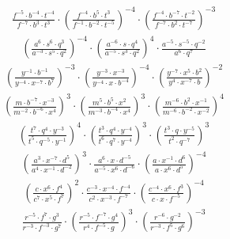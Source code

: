 \begin{align}
\frac{f^{-5}\cdot b^{-4}\cdot t^{-4}}{f^{-7}\cdot b^{3}\cdot t^{3}}\cdot \left(\frac{f^{-4}\cdot b^{5}\cdot t^{3}}{f^{-1}\cdot b^{-2}\cdot t^{-5}}\right)^{-4}\cdot \left(\frac{f^{-4}\cdot b^{-7}\cdot t^{-2}}{f^{-7}\cdot b^{2}\cdot t^{-7}}\right)^{-3}
\end{align}
\begin{align}
\left(\frac{a^{6}\cdot s^{6}\cdot q^{3}}{a^{-3}\cdot s^{5}\cdot q^{2}}\right)^{-4}\cdot \left(\frac{a^{-6}\cdot s\cdot q^{4}}{a^{-5}\cdot s^{3}\cdot q^{2}}\right)^{4}\cdot \frac{a^{-5}\cdot s^{-5}\cdot q^{-2}}{a^{6}\cdot q^{7}}
\end{align}
\begin{align}
\left(\frac{y^{-1}\cdot b^{-1}}{y^{-4}\cdot x^{-7}\cdot b^{7}}\right)^{-3}\cdot \left(\frac{y^{-3}\cdot x^{-3}}{y^{-4}\cdot x\cdot b^{-4}}\right)^{-4}\cdot \left(\frac{y^{-7}\cdot x^{5}\cdot b^{2}}{y^{4}\cdot x^{-7}\cdot b}\right)^{-2}
\end{align}
\begin{align}
\left(\frac{m\cdot b^{-7}\cdot x^{-3}}{m^{-2}\cdot b^{-6}\cdot x^{4}}\right)^{3}\cdot \left(\frac{m^{5}\cdot b^{5}\cdot x^{2}}{m^{-3}\cdot b^{-4}\cdot x^{4}}\right)^{3}\cdot \left(\frac{m^{-6}\cdot b^{2}\cdot x^{-1}}{m^{-6}\cdot b^{-2}\cdot x^{-2}}\right)^{4}
\end{align}
\begin{align}
\left(\frac{t^{7}\cdot q^{4}\cdot y^{-3}}{t^{5}\cdot q^{-5}\cdot y^{-1}}\right)^{4}\cdot \left(\frac{t^{3}\cdot q^{4}\cdot y^{-4}}{t^{6}\cdot q^{7}\cdot y^{-4}}\right)^{3}\cdot \left(\frac{t^{3}\cdot q\cdot y^{-5}}{t^{2}\cdot q^{-7}}\right)^{3}
\end{align}
\begin{align}
\left(\frac{a^{3}\cdot x^{-7}\cdot d^{5}}{a^{4}\cdot x^{-1}\cdot d^{-2}}\right)^{3}\cdot \frac{a^{6}\cdot x\cdot d^{-5}}{a^{-5}\cdot x^{6}\cdot d^{-6}}\cdot \left(\frac{a\cdot x^{-1}\cdot d^{6}}{a\cdot x^{6}\cdot d^{5}}\right)^{-4}
\end{align}
\begin{align}
\left(\frac{c\cdot x^{6}\cdot f^{4}}{c^{7}\cdot x^{5}\cdot f^{7}}\right)^{2}\cdot \frac{c^{-3}\cdot x^{-4}\cdot f^{-4}}{c^{2}\cdot x^{-3}\cdot f^{-7}}\cdot \left(\frac{c^{-4}\cdot x^{6}\cdot f^{3}}{c\cdot x\cdot f^{-5}}\right)^{-4}
\end{align}
\begin{align}
\frac{r^{-5}\cdot f^{7}\cdot g^{3}}{r^{-3}\cdot f^{-3}\cdot g^{7}}\cdot \left(\frac{r^{-5}\cdot f^{-7}\cdot g^{4}}{r^{4}\cdot f^{-5}\cdot g}\right)^{3}\cdot \left(\frac{r^{-6}\cdot g^{-2}}{r^{-3}\cdot f^{5}\cdot g^{6}}\right)^{-3}
\end{align}
